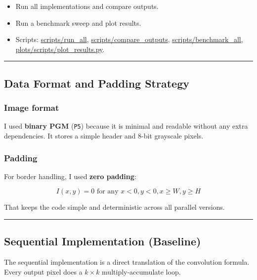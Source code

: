 \documentclass[
]{article}
\providecommand{\tightlist}{%
  \setlength{\itemsep}{0pt}\setlength{\parskip}{0pt}}
\begin{document}
\begin{enumerate}
  \begin{itemize}
  \tightlist
  \item
    Run all implementations and compare outputs.
  \item
    Run a benchmark sweep and plot results.
  \item
    Scripts: \url{scripts/run_all}, \url{scripts/compare_outputs},
    \url{scripts/benchmark_all}, \url{plots/scripts/plot_results.py}.
  \end{itemize}
\end{enumerate}

\begin{center}\rule{0.5\linewidth}{0.5pt}\end{center}

\subsection{Data Format and Padding
Strategy}\label{data-format-and-padding-strategy}

\subsubsection{Image format}\label{image-format}

I used \textbf{binary PGM} (\texttt{P5}) because it is minimal and
readable without any extra dependencies. It stores a simple header and
8-bit grayscale pixels.

\subsubsection{Padding}\label{padding}

For border handling, I used \textbf{zero padding}:

\[I(x,y)=0 \text{ for any } x<0, y<0, x\ge W, y\ge H\]

That keeps the code simple and deterministic across all parallel
versions.

\begin{center}\rule{0.5\linewidth}{0.5pt}\end{center}

\subsection{Sequential Implementation
(Baseline)}\label{sequential-implementation-baseline}

The sequential implementation is a direct translation of the convolution
formula. Every output pixel does a \(k \times k\) multiply-accumulate
loop.
\end{document}
